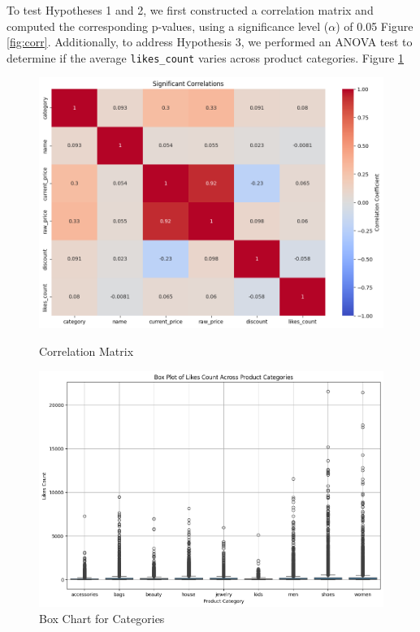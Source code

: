 \documentclass[a4paper,11pt]{article}
\begin{document}
To test Hypotheses 1 and 2, we first constructed a correlation matrix and computed the corresponding p-values, using a significance level (\(\alpha\)) of 0.05 Figure \ref{fig:corr}. Additionally, to address Hypothesis 3, we performed an ANOVA test to determine if the average \texttt{likes\_count} varies across product categories. Figure \ref{fig:box}

\begin{figure}[h!]
    \centering
    \begin{minipage}{0.45\textwidth}
        \centering
        \includegraphics[width=\textwidth]{corr.png}
        \caption{Correlation Matrix}
        \label{fig:corr}
    \end{minipage}
    \hfill
    \begin{minipage}{0.45\textwidth}
        \centering
        \includegraphics[width=\textwidth]{box.png}
        \caption{Box Chart for Categories}
        \label{fig:box}
    \end{minipage}
\end{figure}
\end{document}
